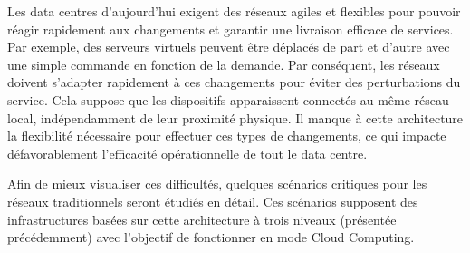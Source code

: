 Les data centres d'aujourd'hui exigent des réseaux agiles et flexibles pour pouvoir réagir rapidement aux changements et garantir une livraison efficace de services. Par exemple, des serveurs virtuels peuvent être déplacés de part et d'autre avec une simple commande en fonction de la demande. Par conséquent, les réseaux doivent s'adapter rapidement à ces changements pour éviter des perturbations du service. Cela suppose que les dispositifs apparaissent connectés au même réseau local, indépendamment de leur proximité physique. Il manque à cette architecture la flexibilité nécessaire pour effectuer ces types de changements, ce qui impacte défavorablement l'efficacité opérationnelle de tout le data centre.


Afin de mieux visualiser ces difficultés, quelques scénarios critiques pour les réseaux traditionnels seront étudiés en détail. Ces scénarios supposent des infrastructures basées sur cette architecture à trois niveaux (présentée précédemment) avec l'objectif de fonctionner en mode Cloud Computing.  \cite{cloudReadyNetworkJuniper} \cite{hpCloudEffectsOnNetworkChanging} \cite{cloudReadyJuniperReferenceNetworkInfra} \cite{bigDataBookChap4}

